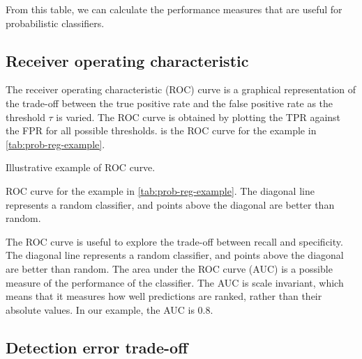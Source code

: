 From this table, we can calculate the performance measures that are useful for
probabilistic classifiers.

\subsection{Receiver operating characteristic}

The receiver operating characteristic (ROC) curve is a graphical representation of the
trade-off between the true positive rate and the false positive rate as the threshold
$\tau$ is varied.  The ROC curve is obtained by plotting the TPR against the FPR for all
possible thresholds.   is the ROC curve for the example in
\cref{tab:prob-reg-example}.

\begin{figurebox}[label=fig:roc-example]{Illustrative example of ROC curve.}
  \centering
  \tcblower
  ROC curve for the example in \cref{tab:prob-reg-example}.  The diagonal line represents
  a random classifier, and points above the diagonal are better than random.
\end{figurebox}

The ROC curve is useful to explore the trade-off between recall and specificity.  The
diagonal line represents a random classifier, and points above the diagonal are better
than random.  The area under the ROC curve (AUC) is a possible measure of the performance
of the classifier.  The AUC is scale invariant, which means that it measures how well
predictions are ranked, rather than their absolute values.  In our example, the AUC is
$0.8$.

\subsection{Detection error trade-off}

